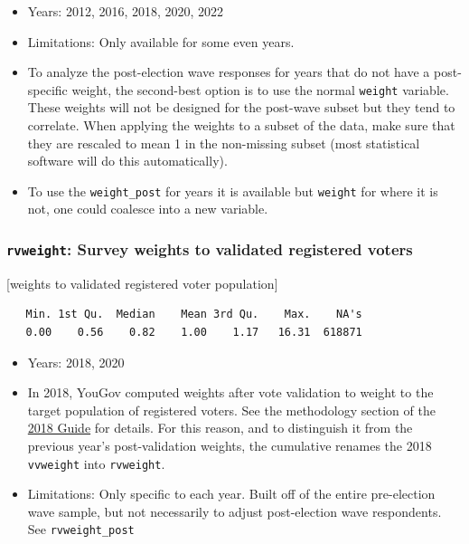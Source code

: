 \documentclass[10pt,article,oneside]{memoir}
\begin{document}
\begin{itemize}
\tightlist
\item
  Years: 2012, 2016, 2018, 2020, 2022
\item
  Limitations: Only available for some even years.
\item
  To analyze the post-election wave responses for years that do not have
  a post-specific weight, the second-best option is to use the normal
  \texttt{weight} variable. These weights will not be designed for the
  post-wave subset but they tend to correlate. When applying the weights
  to a subset of the data, make sure that they are rescaled to mean 1 in
  the non-missing subset (most statistical software will do this
  automatically).
\item
  To use the \texttt{weight\_post} for years it is available but
  \texttt{weight} for where it is not, one could coalesce into a new
  variable.
\end{itemize}

\subsubsection{\texorpdfstring{\texttt{rvweight}: Survey weights to
validated registered
voters}{rvweight: Survey weights to validated registered voters}}\label{rvweight-survey-weights-to-validated-registered-voters}

{[}weights to validated registered voter population{]}

\begin{verbatim}
   Min. 1st Qu.  Median    Mean 3rd Qu.    Max.    NA's 
   0.00    0.56    0.82    1.00    1.17   16.31  618871 
\end{verbatim}

\begin{itemize}
\tightlist
\item
  Years: 2018, 2020
\item
  In 2018, YouGov computed weights after vote validation to weight to
  the target population of registered voters. See the methodology
  section of the \href{https://doi.org/10.7910/DVN/ZSBZ7K}{2018 Guide}
  for details. For this reason, and to distinguish it from the previous
  year's post-validation weights, the cumulative renames the 2018
  \texttt{vvweight} into \texttt{rvweight}.
\item
  Limitations: Only specific to each year. Built off of the entire
  pre-election wave sample, but not necessarily to adjust post-election
  wave respondents. See \texttt{rvweight\_post}
\end{itemize}
\end{document}
